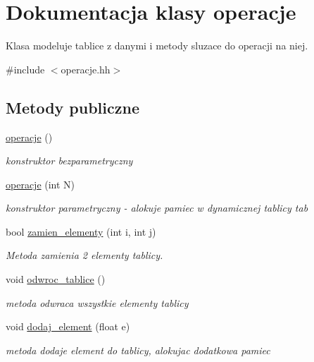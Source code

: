 \hypertarget{classoperacje}{\section{\-Dokumentacja klasy operacje}
\label{classoperacje}
}


\-Klasa modeluje tablice z danymi i metody sluzace do operacji na niej.  




{\ttfamily \#include $<$operacje.\-hh$>$}

\subsection*{\-Metody publiczne}
\begin{DoxyCompactItemize}
\item 
\hyperlink{classoperacje_a4538e0bfde26291449dc057134b23ad8}{operacje} ()
\begin{DoxyCompactList}\small\item\em konstruktor bezparametryczny \end{DoxyCompactList}\item 
\hyperlink{classoperacje_af109f7f9a4b10334d5e8c215c7f220de}{operacje} (int \-N)
\begin{DoxyCompactList}\small\item\em konstruktor parametryczny -\/ alokuje pamiec w dynamicznej tablicy {\ttfamily tab} {\ttfamily } \end{DoxyCompactList}\item 
bool \hyperlink{classoperacje_a7393a8b3b394921a084e0c1f4ad517b7}{zamien\-\_\-elementy} (int i, int j)
\begin{DoxyCompactList}\small\item\em \-Metoda zamienia 2 elementy tablicy. \end{DoxyCompactList}\item 
void \hyperlink{classoperacje_aedc47c87f4f44f8af0cba64a940a5333}{odwroc\-\_\-tablice} ()
\begin{DoxyCompactList}\small\item\em metoda odwraca wszystkie elementy tablicy \end{DoxyCompactList}\item 
void \hyperlink{classoperacje_ad8397efded792c1381bfd0292b3e91b6}{dodaj\-\_\-element} (float e)
\begin{DoxyCompactList}\small\item\em metoda dodaje element do tablicy, alokujac dodatkowa pamiec \end{DoxyCompactList}\item 

\end{DoxyCompactItemize}
